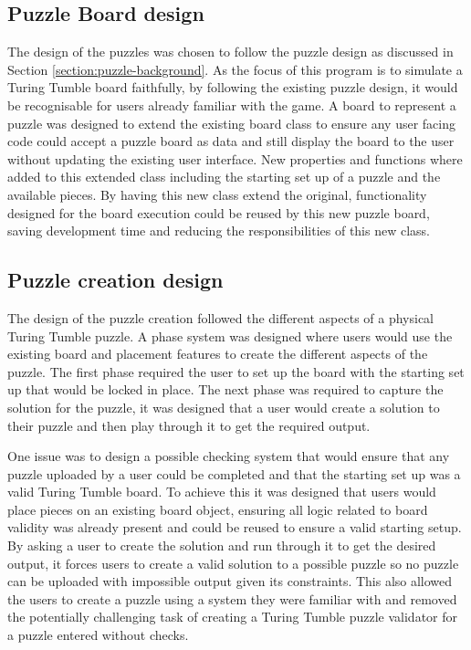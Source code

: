 \documentclass{l4proj}
\begin{document}
\subsection{Puzzle Board design}
The design of the puzzles was chosen to follow the puzzle design as discussed in Section \ref{section:puzzle-background}. As the focus of this program is to simulate a Turing Tumble board faithfully, by following the existing puzzle design, it would be recognisable for users already familiar with the game. A board to represent a puzzle was designed to extend the existing board class to ensure any user facing code could accept a puzzle board as data and still display the board to the user without updating the existing user interface. New properties and functions where added to this extended class including the starting set up of a puzzle and the available pieces. By having this new class extend the original, functionality designed for the board execution could be reused by this new puzzle board, saving development time and reducing the responsibilities of this new class. 

\subsection{Puzzle creation design}
The design of the puzzle creation followed the different aspects of a physical Turing Tumble puzzle. A phase system was designed where users would use the existing board and placement features to create the different aspects of the puzzle. The first phase required the user to set up the board with the starting set up that would be locked in place. The next phase was required to capture the solution for the puzzle, it was designed that a user would create a solution to their puzzle and then play through it to get the required output. 

One issue was to design a possible checking system that would ensure that any puzzle uploaded by a user could be completed and that the starting set up was a valid Turing Tumble board. To achieve this it was designed that users would place pieces on an existing board object, ensuring all logic related to board validity was already present and could be reused to ensure a valid starting setup. By asking a user to create the solution and run through it to get the desired output, it forces users to create a valid solution to a possible puzzle so no puzzle can be uploaded with impossible output given its constraints. This also allowed the users to create a puzzle using a system they were familiar with and removed the potentially challenging task of creating a Turing Tumble puzzle validator for a puzzle entered without checks. 
\end{document}
